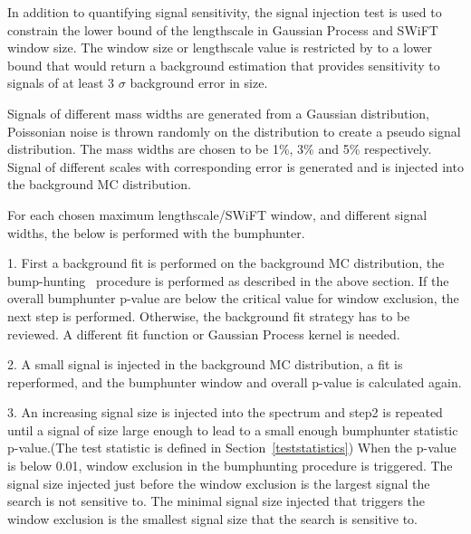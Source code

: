 
    In addition to quantifying signal sensitivity, the signal injection test is used to constrain the lower bound of the lengthscale in Gaussian Process and SWiFT window size. The window size or lengthscale value is restricted by to a lower bound that would return a background estimation that provides sensitivity to signals of at least 3 $\sigma$ background error in size.

    Signals of different mass widths are generated from a Gaussian distribution, Poissonian noise is thrown randomly on the distribution to create a pseudo signal distribution. The mass widths are chosen to be 1\%, 3\% and 5\% respectively. Signal of different scales with corresponding error is generated and is injected into the background MC distribution.

    For each chosen maximum lengthscale/SWiFT window, and different signal widths, the below is performed with the bumphunter.

   1. First a background fit is performed on the background MC distribution, the bump-hunting~\cite{choudalakis2011hypothesis} procedure is performed as described in the above section. If the overall bumphunter p-value are below the critical value for window exclusion, the next step is performed. Otherwise, the background fit strategy has to be reviewed. A different fit function or Gaussian Process kernel is needed.

   2. A small signal is injected in the background MC distribution, a fit is reperformed, and the bumphunter window and overall p-value is calculated again. 

   3. An increasing signal size is injected into the spectrum and step2 is repeated until a signal of size large enough to lead to a small enough bumphunter statistic p-value.(The test statistic is defined in Section~\ref{teststatistics}) When the p-value is below 0.01, window exclusion in the bumphunting procedure is triggered. The signal size injected just before the window exclusion is the largest signal the search is not sensitive to. The minimal signal size injected that triggers the window exclusion is the smallest signal size that the search is sensitive to. 


